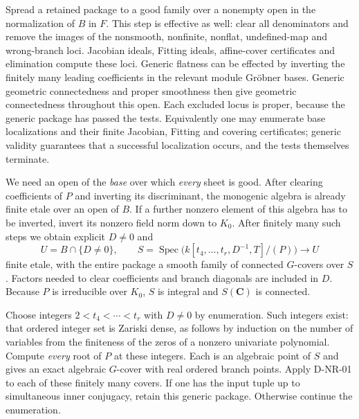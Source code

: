 Spread a retained package to a good family over a nonempty open in the
normalization of $B$ in $F$.  This step is effective as well: clear all
denominators and remove the images of the nonsmooth, nonfinite,
nonflat, undefined-map and wrong-branch loci.  Jacobian ideals,
Fitting ideals, affine-cover certificates and elimination compute these
loci.  Generic flatness can be effected by inverting the finitely many
leading coefficients in the relevant module Gr\"obner bases.  Generic
geometric connectedness and proper smoothness then give geometric
connectedness throughout this open.  Each excluded locus is proper,
because the generic package has passed the tests.  Equivalently one may
enumerate base localizations and their finite Jacobian, Fitting and
covering certificates; generic validity guarantees that a successful
localization occurs, and the tests themselves terminate.

We need an open of the \emph{base} over which \emph{every} sheet is good.
After clearing coefficients of $P$ and inverting its discriminant, the
monogenic algebra is already finite etale over an open of $B$.  If a
further nonzero element of this algebra has to be inverted, invert its
nonzero field norm down to $K_0$.  After finitely many such steps we obtain
explicit $D\ne0$ and
\[
 U=B\cap\{D\ne0\},\qquad
 S=\operatorname{Spec}\bigl(k[t_4,\ldots,t_r,D^{-1},T]/(P)\bigr)
       \longrightarrow U                                    \tag{NR.5}
\]
finite etale, with the entire package a smooth family of connected
$G$-covers over $S$.  Factors needed to clear coefficients and branch
diagonals are included in $D$.  Because $P$ is irreducible over $K_0$,
$S$ is integral and $S(\mathbf C)$ is connected.

Choose integers $2<t_4<\cdots<t_r$ with $D\ne0$ by enumeration.
Such integers exist: that ordered integer set is Zariski dense, as follows
by induction on the number of variables from the finiteness of the zeros
of a nonzero univariate polynomial.  Compute \emph{every} root of
$P$ at these integers.  Each is an algebraic point of $S$ and gives an
exact algebraic $G$-cover with real ordered branch points.  Apply D-NR-01
to each of these finitely many covers.  If one has the input tuple up to
simultaneous inner conjugacy, retain this generic package.  Otherwise
continue the enumeration.


